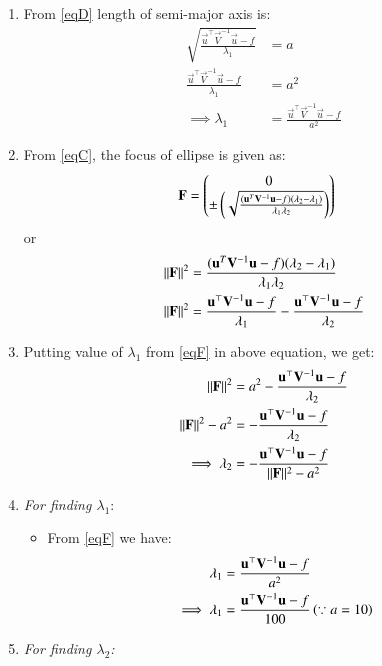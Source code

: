 \documentclass[journal,12pt,twocolumn]{IEEEtran}
\begin{document}
\begin{enumerate}
\item From \eqref{eqD} length of semi-major axis is:
\begin{align}
 \sqrt{\frac{\vec{u}^{\top}\vec{V}^{-1}\vec{u}-f}{\lambda_1}} &= a
\\
 \frac{\vec{u}^{\top}\vec{V}^{-1}\vec{u}-f}{\lambda_1} &= a^2
\\
\implies \lambda_1&=\frac{\vec{u}^{\top}\vec{V}^{-1}\vec{u}-f}{a^2}\label{eqF} 
\end{align}
\item From \eqref{eqC}, the focus of ellipse is given as:
\begin{align}
 \mathbf{F} &= \begin{pmatrix}0\\\pm \left(\sqrt{\frac{(\mathbf{u}^T\mathbf{V}^{-1}\mathbf{u}-f)(\lambda_2-\lambda_1)}{\lambda_1\lambda_2}}\right)\end{pmatrix}
 \end{align}
 or
 \begin{align}
\lVert\mathbf{F}\rVert^2 &= \frac{(\mathbf{u}^T\mathbf{V}^{-1}\mathbf{u}-f)(\lambda_2-\lambda_1)}{\lambda_1\lambda_2}
 \\
\lVert\mathbf{F}\rVert^2 &= \frac{\mathbf{u}^{\top}\mathbf{V}^{-1}\mathbf{u}-f}{\lambda_1}-\frac{\mathbf{u}^{\top}\mathbf{V}^{-1}\mathbf{u}-f}{\lambda_2} \label{eqE}
 \end{align}
\item Putting value of $\lambda_1$ from \eqref{eqF} in above equation, we get:
\begin{align}
    \lVert\mathbf{F}\rVert^2&=a^2- \frac{\mathbf{u}^{\top}\mathbf{V}^{-1}\mathbf{u}-f}{\lambda_2}
    \\
    \lVert\mathbf{F}\rVert^2-a^2 &= -\frac{\mathbf{u}^{\top}\mathbf{V}^{-1}\mathbf{u}-f}{\lambda_2}
    \\
 \implies \lambda_2 &= -\frac{\mathbf{u}^{\top}\mathbf{V}^{-1}\mathbf{u}-f}{\lVert\mathbf{F}\rVert^2-a^2}\label{eq1}
    \end{align}
    \item \textit{For finding $\lambda_1$}:
\begin{itemize}
    \item From \eqref{eqF} we have:
\begin{align}
\lambda_1&=\frac{\mathbf{u}^{\top}\mathbf{V}^{-1}\mathbf{u}-f}{a^2}
\\
\implies \lambda_1&=\frac{\mathbf{u}^{\top}\mathbf{V}^{-1}\mathbf{u}-f}{100} \left(\because a=10\right) \label{eqH}
\end{align}
\end{itemize}
\item \textit{For finding $\lambda_2$:}
\begin{itemize}

\end{itemize}
\end{enumerate}
\end{document}
